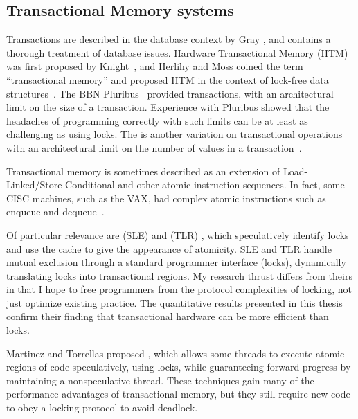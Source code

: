 
\subsection{Transactional Memory systems}\label{sec:tm}

Transactions are described in the database context by Gray
\cite{Gray81b}, and \cite{GrayRe93} contains a thorough treatment of
database issues.  Hardware Transactional Memory (HTM) was first
proposed by Knight~\cite{Knight86},
and Herlihy and Moss coined the term ``transactional memory'' and
proposed HTM in the context of lock-free data
structures~\cite{HerlihyMo92,HerlihyMo93}.  The BBN
Pluribus~\cite[Ch.~23]{SiewiorekBeNe82} provided transactions, with an
architectural limit on the size of a transaction.  Experience with
Pluribus showed that the headaches of programming correctly with such
limits can be at least as challenging as using locks.  The
 is another variation on transactional
operations with an architectural limit on the number of values in a
transaction~\cite{StoneStHe93}.

Transactional memory is sometimes described as an extension of
Load-Linked/Store-Conditional \cite{JensenHaBr87} and other atomic
instruction sequences.  In fact, some CISC machines, such as the VAX,
had complex atomic instructions such as enqueue and
dequeue~\cite{Digital96}.

Of particular relevance are  (SLE) \cite{RajwarGo01} and 
(TLR) \cite{RajwarGo02}, which speculatively identify locks and use
the cache to give the appearance of atomicity.  SLE and TLR handle
mutual exclusion through a standard programmer interface (locks),
dynamically translating locks into transactional regions.  My
research thrust differs from theirs in that I hope to free
programmers from the protocol complexities of locking, not just
optimize existing practice.  The quantitative results presented in
this thesis confirm their finding that transactional hardware can be
more efficient than locks.

Martinez and Torrellas proposed 
\cite{MartinezTo02}, which allows some threads to execute atomic
regions of code speculatively, using locks, while guaranteeing forward
progress by maintaining a nonspeculative thread.  These techniques
gain many of the performance advantages of transactional memory, but
they still require new code to obey a locking protocol to avoid
deadlock.

